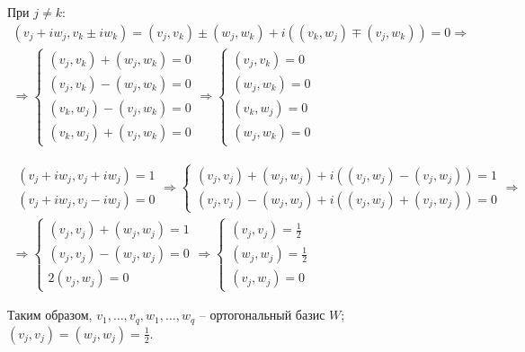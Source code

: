 \documentclass[main]{subfiles}
\begin{document}
При $j \neq k$: 
\begin{gather*}
    (v_j + iw_j, v_k \pm iw_k) = (v_j, v_k) \pm (w_j, w_k) + i((v_k, w_j) \mp (v_j, w_k)) = 0 \Rightarrow \\ \Rightarrow
\left\{ \begin{gathered} 
    (v_j, v_k) + (w_j, w_k) = 0 \\
    (v_j, v_k) - (w_j, w_k) = 0 \\
    (v_k, w_j) - (v_j, w_k) = 0 \\
    (v_k, w_j) + (v_j, w_k) = 0 
\end{gathered} \right. \Rightarrow \left\{ \begin{gathered} 
    (v_j, v_k) = 0 \\
    (w_j, w_k) = 0 \\
    (v_k, w_j) = 0 \\
    (w_j, w_k) = 0 
\end{gathered} \right.
\end{gather*} 

\begin{gather*}
    \begin{gathered} 
        (v_j + iw_j, v_j + iw_j) = 1 \\
        (v_j + iw_j, v_j - iw_j) = 0 
    \end{gathered} \Rightarrow \left\{ \begin{gathered} 
        (v_j, v_j) + (w_j, w_j) + i((v_j, w_j) - (v_j, w_j)) = 1 \\
        (v_j, v_j) - (w_j, w_j) + i((v_j, w_j) + (v_j, w_j)) = 0 
    \end{gathered} \right.  \Rightarrow \\
    \Rightarrow 
    \left \{ 
        \begin{gathered} 
        (v_j, v_j) + (w_j, w_j) = 1 \\
        (v_j, v_j) - (w_j, w_j) = 0 \\
        2(v_j, w_j) = 0
    \end{gathered} \right. 
    \Rightarrow 
    \left \{ 
        \begin{gathered} 
        (v_j, v_j) = \frac{1}{2} \\
        (w_j, w_j) = \frac{1}{2} \\
        (v_j, w_j) = 0
    \end{gathered} \right. 
\end{gather*}

Таким образом, $v_1, \ldots, v_q, w_1, \ldots, w_q$ -- ортогональный базис $W$; $(v_j, v_j) = (w_j, w_j) = \frac{1}{2}$.
\end{document}
